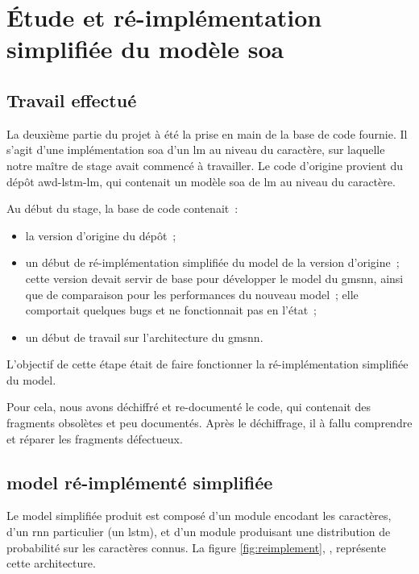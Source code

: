\section{Étude et ré-implémentation simplifiée du modèle \gls{soa}}
\subsection{Travail effectué}\label{subsec:codebase}
La deuxième partie du projet à été la prise en main de la base de code fournie.
Il s'agit d'une implémentation \gls{soa} d'un \gls{lm} au niveau du caractère, sur laquelle notre maître de stage avait commencé à travailler.
Le code d'origine provient du dépôt \og awd-lstm-lm\fg{}\autocite{awd_source}, qui contenait un modèle \gls{soa} de \gls{lm} au niveau du caractère.

Au début du stage, la base de code contenait~:
\begin{itemize}
	\item la version d'origine du dépôt~;
	\item un début de ré-implémentation simplifiée du \gls{model} de la version d'origine~; cette version  devait servir de base pour développer le \gls{model} du \gls{gmsnn}, ainsi que de comparaison pour les performances du nouveau \gls{model}~; elle comportait quelques \glspl{bug} et ne fonctionnait pas en l'état~;
	\item un début de travail sur l'architecture du \gls{gmsnn}.
\end{itemize}

\vspace{1em}
L'objectif de cette étape était de faire fonctionner la ré-implémentation simplifiée du \gls{model}.

Pour cela, nous avons déchiffré et re-documenté le code, qui contenait des fragments obsolètes et peu documentés.
Après le déchiffrage, il à fallu comprendre et réparer les fragments défectueux.

\pagebreak
\subsection[\Glsentrytext{model} ré-implémenté simplifiée]{\Gls{model} ré-implémenté simplifiée} 
Le \gls{model} simplifiée produit est composé d'un module encodant les caractères, d'un \gls{rnn} particulier (un \gls{lstm}), et d'un module produisant une distribution de probabilité sur les caractères connus. La figure \ref{fig:reimplement}, , représente cette architecture.

